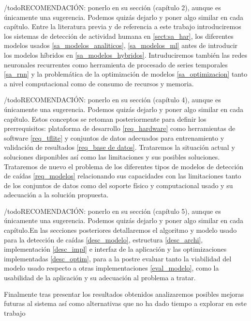 /todo{RECOMENDACIÓN: ponerlo en su sección (capítulo 2), aunque es únicamente una sugerencia. Podemos quizás dejarlo y poner algo similar en cada capítulo.} Entre la literatura previa y de referencia a este trabajo introduciremos los sistemas de detección de actividad humana en \ref{sect:sa_har}, los diferentes modelos usados \ref{sa_modelos_analiticos}, \ref{sa_modelos_ml} antes de introducir los modelos híbridos en \ref{sa_modelos_hybridos}. Intruduciremos también las redes neuronales recurrentes como herramienta de procesado de series temporales \ref{sa_rnn} y la problemática de la optimización de modelos \ref{sa_optimizacion} tanto a nivel computacional como de consumo de recursos y memoria.

/todo{RECOMENDACIÓN: ponerlo en su sección (capítulo 4), aunque es únicamente una sugerencia. Podemos quizás dejarlo y poner algo similar en cada capítulo.} Estos conceptos se retoman posteriormente para definir los prerrequisitos: plataforma de desarrollo \ref{req_hardware} como herramientas de software \ref{req_tflite} y conjuntos de datos adecuados para entrenamiento y validación de resultados \ref{req_base de datos}. Trataremos la situación actual y soluciones disponibles así como las limitaciones y sus posibles soluciones. Trataremos de nuevo el problema de los diferentes tipos de modelos de detección de caídas \ref{req_modelos} relacionando sus capacidades con las limitaciones tanto de los conjuntos de datos como del soporte físico y computacional usado y su adecuación a la solución propuesta.

/todo{RECOMENDACIÓN: ponerlo en su sección (capítulo 5), aunque es únicamente una sugerencia. Podemos quizás dejarlo y poner algo similar en cada capítulo.}En las secciones posteriores detallaremos el algoritmo y modelo usado para la detección de caídas \ref{desc_modelo}, estructura \ref{desc_archi}, implementación \ref{desc_impl} e interfaz de la aplicación y las optimizaciones implementadas \ref{desc_optim}, para a la postre evaluar tanto la viabilidad del modelo usado respecto a otras implementaciones \ref{eval_modelo}, como la usabilidad de la aplicación y su adecuación al problema a tratar.

Finalmente tras presentar los resultados obtenidos analizaremos posibles mejoras futuras al sistema así como alternativas que no ha dado tiempo a explorar en este trabajo

%
